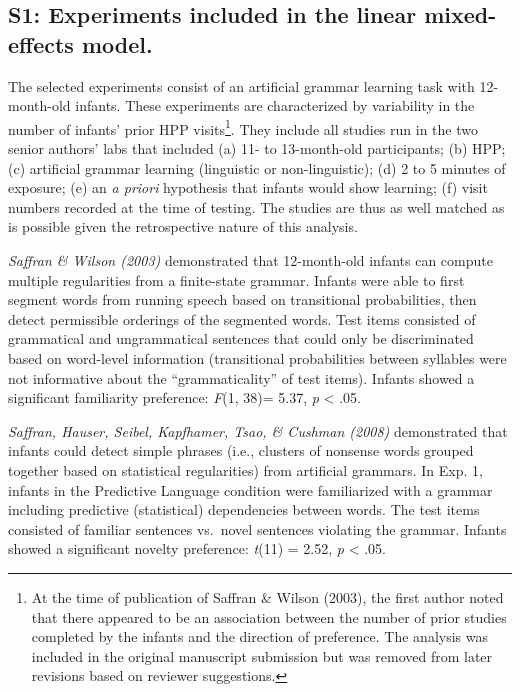 \clearpage
\makeatletter
\efloat@restorefloats
\makeatother


\begin{appendix}
\section{}
\hypertarget{s1-experiments-included-in-the-linear-mixed-effects-model.}{%
\subsection{S1: Experiments included in the linear mixed-effects
model.}\label{s1-experiments-included-in-the-linear-mixed-effects-model.}}

The selected experiments consist of an artificial grammar learning task
with 12-month-old infants. These experiments are characterized by
variability in the number of infants' prior HPP visits\footnote{At the
  time of publication of Saffran \& Wilson (2003), the first author
  noted that there appeared to be an association between the number of
  prior studies completed by the infants and the direction of
  preference. The analysis was included in the original manuscript
  submission but was removed from later revisions based on reviewer
  suggestions.}. They include all studies run in the two senior authors'
labs that included (a) 11- to 13-month-old participants; (b) HPP; (c)
artificial grammar learning (linguistic or non-linguistic); (d) 2 to 5
minutes of exposure; (e) an \emph{a priori} hypothesis that infants
would show learning; (f) visit numbers recorded at the time of testing.
The studies are thus as well matched as is possible given the
retrospective nature of this analysis.

\emph{Saffran \& Wilson (2003)} demonstrated that 12-month-old infants
can compute multiple regularities from a finite-state grammar. Infants
were able to first segment words from running speech based on
transitional probabilities, then detect permissible orderings of the
segmented words. Test items consisted of grammatical and ungrammatical
sentences that could only be discriminated based on word-level
information (transitional probabilities between syllables were not
informative about the ``grammaticality'' of test items). Infants showed
a significant familiarity preference: \emph{F}(1, 38)= 5.37, \emph{p}
\textless{} .05.

\emph{Saffran, Hauser, Seibel, Kapfhamer, Tsao, \& Cushman (2008)}
demonstrated that infants could detect simple phrases (i.e., clusters of
nonsense words grouped together based on statistical regularities) from
artificial grammars. In Exp. 1, infants in the Predictive Language
condition were familiarized with a grammar including predictive
(statistical) dependencies between words. The test items consisted of
familiar sentences vs.~novel sentences violating the grammar. Infants
showed a significant novelty preference: \emph{t}(11) = 2.52, \emph{p}
\textless{} .05.


\end{appendix}
